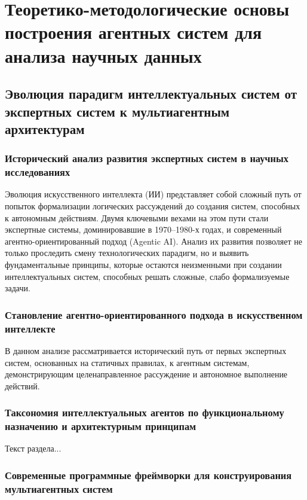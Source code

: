 
\newpage
\section{Теоретико-методологические основы построения агентных систем для анализа научных данных}

\subsection{Эволюция парадигм интеллектуальных систем от экспертных систем к мультиагентным архитектурам}

\subsubsection{Исторический анализ развития экспертных систем в научных исследованиях}

Эволюция искусственного интеллекта (ИИ) представляет собой сложный путь от попыток формализации логических рассуждений до создания систем, способных к автономным действиям. Двумя ключевыми вехами на этом пути стали экспертные системы, доминировавшие в 1970–1980-х годах, и современный агентно-ориентированный подход (Agentic AI). Анализ их развития позволяет не только проследить смену технологических парадигм, но и выявить фундаментальные принципы, которые остаются неизменными при создании интеллектуальных систем, способных решать сложные, слабо формализуемые задачи.

\subsubsection{Становление агентно-ориентированного подхода в искусственном интеллекте}

В данном анализе рассматривается исторический путь от первых экспертных систем, основанных на статичных правилах, к агентным системам, демонстрирующим целенаправленное рассуждение и автономное выполнение действий.

\subsubsection{Таксономия интеллектуальных агентов по функциональному назначению и архитектурным принципам}

Текст раздела...

\subsubsection{Современные программные фреймворки для конструирования мультиагентных систем}

